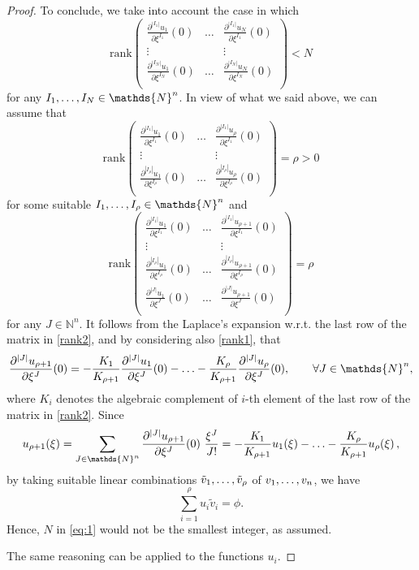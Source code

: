 \documentclass[10pt,a4paper]{amsart}
\newcommand{\N}{\mathds{N}}
\newcommand{\de}{\partial}
\begin{document}
\begin{proof}
\noindent
To conclude, we take into account the case in which
$$\mathrm{rank} \begin{pmatrix}
\frac{\de^{|I_1|} u_1}{\de\xi^{I_1}}(0) &\dots&\frac{\de^{|I_1|} u_N}{\de\xi^{I_1}}(0) \\
\vdots& &\vdots\\
\frac{\de^{|I_N|} u_1}{\de\xi^{I_N}}(0) &\dots&\frac{\de^{|I_N|} u_N}{\de\xi^{I_N}}(0) \\
\end{pmatrix}<N$$
for any $I_1,\mathellipsis,I_N\in\N^n$. In view of what we said above, we can assume that
\begin{equation}\label{rank1}
\mathrm{rank} \begin{pmatrix}
\frac{\de^{|I_1|} u_1}{\de\xi^{I_1}}(0) &\dots&\frac{\de^{|I_1|} u_\rho}{\de\xi^{I_1}}(0) \\
\vdots& &\vdots\\
\frac{\de^{|I_\rho|} u_1}{\de\xi^{I_\rho}}(0) &\dots&\frac{\de^{|I_\rho|} u_\rho}{\de\xi^{I_\rho}}(0) \\
\end{pmatrix}=\rho>0\end{equation}
for some suitable  $I_1,\mathellipsis,I_\rho\in\N^n$ and
\begin{equation}\label{rank2}
\mathrm{rank} \begin{pmatrix}
\frac{\de^{|I_1|} u_1}{\de\xi^{I_1}}(0) &\dots&\frac{\de^{|I_1|}  u_{\rho+1}}{\de\xi^{I_1}}(0) \\
\vdots& &\vdots\\
\frac{\de^{|I_\rho|}  u_1}{\de\xi^{I_\rho}}(0) &\dots&\frac{\de^{|I_\rho|} u_{\rho+1}}{\de\xi^{I_\rho}}(0) \\
\frac{\de^{|J|} u_1}{\de\xi^{J}}(0) &\dots&\frac{\de^{|J|} u_{\rho+1}}{\de\xi^{J}}(0) \\
\end{pmatrix}=\rho\end{equation}
for any $J\in\N^n$.
It follows from the Laplace's expansion w.r.t. the last row of the matrix in \eqref{rank2}, and by considering also \eqref{rank1}, that
\begin{equation*}%
\frac{\de^{|J|} u_{\rho+1}}{\de\xi^{J}}(0)=-\frac{K_1}{K_{\rho+1}} \frac{\de^{|J|} u_1}{\de\xi^{J}}(0)-\mathellipsis -\frac{K_\rho}{K_{\rho+1}} \frac{\de^{|J|} u_\rho}{\de\xi^{J}}(0),\qquad \forall J\in\N^n,
\end{equation*}
where $K_i$ denotes the algebraic complement of $i$-th element of the last row of the matrix in \eqref{rank2}.
Since
$$
u_{\rho+1}(\xi)=\sum_{J\in\N^n}\frac{\de^{|J|} u_{\rho+1}}{\de\xi^{J}}(0)\  \frac{\xi^J}{J!} =-\frac{K_1}{K_{\rho+1}} u_1(\xi)-\mathellipsis-\frac{K_\rho}{K_{\rho+1}} u_\rho(\xi)\,,
$$
by taking suitable linear combinations $\tilde v_1,\mathellipsis,\tilde v_\rho$ of $v_1,\mathellipsis,v_n$, we have 
$$\sum_{i=1}^\rho u_i\tilde v_i=\phi.$$ Hence, $N$ in \eqref{eq:1} would not be the smallest integer, as assumed.

\smallskip\noindent
The same reasoning can be applied to the functions $u_i$.
\end{proof}
\end{document}
